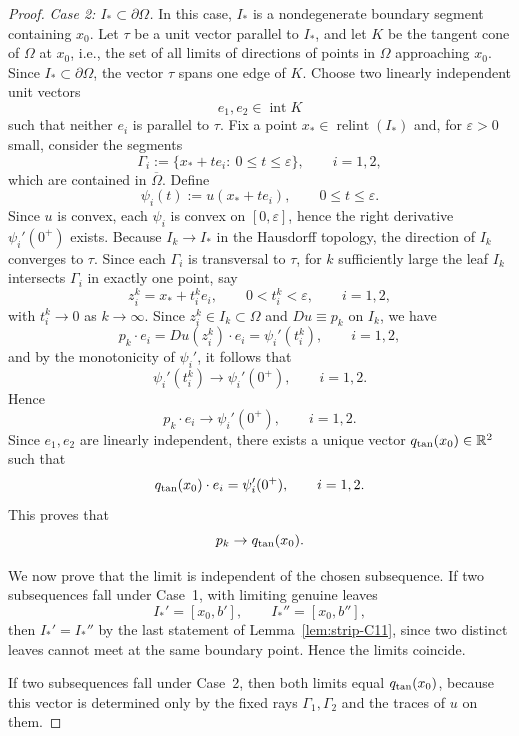 \documentclass[reqno,11pt]{amsart}
\numberwithin{equation}{section}
\theoremstyle{remark}
\begin{document}
\begin{proof}
\smallskip
\noindent\emph{Case 2: \(I_*\subset \partial\Omega\).}
In this case, \(I_*\) is a nondegenerate boundary segment containing \(x_0\). Let
\(\tau\) be a unit vector parallel to \(I_*\), and let \(K\) be the tangent cone
of \(\Omega\) at \(x_0\), i.e., the set of all limits of directions of points in \(\Omega\) approaching \(x_0\). Since \(I_*\subset \partial\Omega\), the vector \(\tau\)
spans one edge of \(K\). Choose two linearly independent unit vectors
\[
e_1,e_2\in \operatorname{int} K
\]
such that neither \(e_i\) is parallel to \(\tau\). Fix a point \(x_*\in \operatorname{relint}(I_*)\) and, for \(\varepsilon>0\) small, consider the segments
\[
\Gamma_i:=\{x_*+t e_i:\ 0\le t\le \varepsilon\},
\qquad i=1,2,
\]
which are contained in \(\overline\Omega\).
Define
\[
\psi_i(t):=u(x_*+t e_i),
\qquad 0\le t\le \varepsilon.
\]
Since \(u\) is convex, each \(\psi_i\) is convex on \([0,\varepsilon]\), hence
the right derivative \(\psi_i'(0^+)\) exists.
Because \(I_k\to I_*\) in the Hausdorff topology, the direction of \(I_k\)
converges to \(\tau\). Since each \(\Gamma_i\) is transversal to \(\tau\), for
\(k\) sufficiently large the leaf \(I_k\) intersects \(\Gamma_i\) in exactly one
point, say
\[
z_i^k=x_*+t_i^k e_i,
\qquad 0<t_i^k<\varepsilon,
\qquad i=1,2,
\]
with \(t_i^k\to 0\) as \(k\to\infty\).
Since \(z_i^k\in I_k\subset \Omega\) and \(Du\equiv p_k\) on \(I_k\), we have
\[
p_k\cdot e_i
=
Du(z_i^k)\cdot e_i
=
\psi_i'(t_i^k),
\qquad i=1,2,
\]
and by the monotonicity of \(\psi_i'\), it follows that
\[
\psi_i'(t_i^k)\to \psi_i'(0^+),
\qquad i=1,2.
\]
Hence
\[
p_k\cdot e_i\to \psi_i'(0^+),
\qquad i=1,2.
\]
Since \(e_1,e_2\) are linearly independent, there exists a unique vector \(q_{\rm tan}(x_0)\in \mathbb R^2\)
such that
\[
q_{\rm tan}(x_0)\cdot e_i=\psi_i'(0^+),
\qquad i=1,2.
\]
This proves that
\[
p_k\to q_{\rm tan}(x_0).
\]

We now prove that the limit is independent of the chosen subsequence.
If two subsequences fall under Case~1, with limiting genuine leaves
\[
I_*'=[x_0,b'],
\qquad
I_*''=[x_0,b''],
\]
then \(I_*'=I_*''\) by the last statement of Lemma~\ref{lem:strip-C11}, since
two distinct leaves cannot meet at the same boundary point. Hence the limits coincide.

If two subsequences fall under Case~2, then both limits equal \(q_{\rm tan}(x_0)\), because this vector is determined only by the fixed rays \(\Gamma_1,\Gamma_2\) and the traces of \(u\) on them.



\end{proof}
\end{document}
